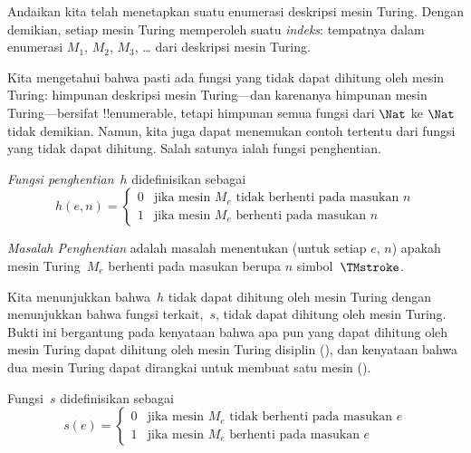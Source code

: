 \documentclass[../../../include/open-logic-section]{subfiles}
\begin{document}

\begin{explain}
Andaikan kita telah menetapkan suatu enumerasi deskripsi mesin Turing. Dengan
demikian, setiap mesin Turing memperoleh suatu \emph{indeks}: tempatnya dalam
enumerasi $M_1$, $M_2$, $M_3$, \dots{} dari deskripsi mesin Turing.

Kita mengetahui bahwa pasti ada fungsi yang tidak dapat dihitung oleh mesin
Turing: himpunan deskripsi mesin Turing---dan karenanya himpunan mesin
Turing---bersifat !!{enumerable}, tetapi himpunan semua fungsi dari $\Nat$ ke
$\Nat$ tidak demikian. Namun, kita juga dapat menemukan contoh tertentu dari
fungsi yang tidak dapat dihitung. Salah satunya ialah fungsi penghentian.
\end{explain}

\begin{defn}
 \emph{Fungsi penghentian}~$h$ didefinisikan sebagai
\[
h(e,n) =
\begin{cases}
  \text{0} & \text{jika mesin~$M_e$ tidak berhenti pada masukan $n$} \\
  \text{1} & \text{jika mesin~$M_e$ berhenti pada masukan $n$}
\end{cases}
\]
\end{defn}

\begin{defn}
\emph{Masalah Penghentian} adalah masalah menentukan (untuk setiap $e$, $n$)
apakah mesin Turing~$M_e$ berhenti pada masukan berupa $n$ simbol~$\TMstroke$.
\end{defn}

\begin{explain}
Kita menunjukkan bahwa~$h$ tidak dapat dihitung oleh mesin Turing dengan
menunjukkan bahwa fungsi terkait,~$s$, tidak dapat dihitung oleh mesin Turing.
Bukti ini bergantung pada kenyataan bahwa apa pun yang dapat dihitung oleh
mesin Turing dapat dihitung oleh mesin Turing disiplin
(), dan kenyataan bahwa dua mesin Turing dapat dirangkai
untuk membuat satu mesin ().
\end{explain}

\begin{defn} Fungsi~$s$ didefinisikan sebagai
\[
s(e) =
\begin{cases}
  \text{0} & \text{jika mesin~$M_e$ tidak berhenti pada masukan $e$} \\
  \text{1} & \text{jika mesin~$M_e$ berhenti pada masukan $e$}
\end{cases}
\]
\end{defn}
\end{document}
